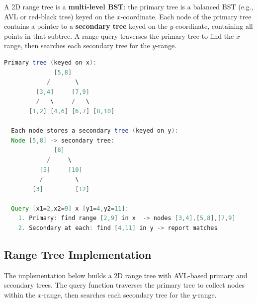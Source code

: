 A 2D range tree is a \textbf{multi-level BST}: the primary tree is a balanced BST (e.g., AVL or red-black tree) keyed on the $x$-coordinate. Each node of the primary tree contains a pointer to a \textbf{secondary tree} keyed on the $y$-coordinate, containing all points in that subtree. A range query traverses the primary tree to find the $x$-range, then searches each secondary tree for the $y$-range.

\begin{lstlisting}[language=Java]
  Primary tree (keyed on x):
              [5,8]
            /       \
         [3,4]     [7,9]
         /   \     /   \
       [1,2] [4,6] [6,7] [8,10]

  Each node stores a secondary tree (keyed on y):
  Node [5,8] -> secondary tree:
              [8]
            /     \
          [5]     [10]
          /         \
        [3]         [12]

  Query [x1=2,x2=9] x [y1=4,y2=11]:
    1. Primary: find range [2,9] in x  -> nodes [3,4],[5,8],[7,9]
    2. Secondary at each: find [4,11] in y -> report matches
\end{lstlisting}

\subsection{Range Tree Implementation}

The implementation below builds a 2D range tree with AVL-based primary and secondary trees. The query function traverses the primary tree to collect nodes within the $x$-range, then searches each secondary tree for the $y$-range.

